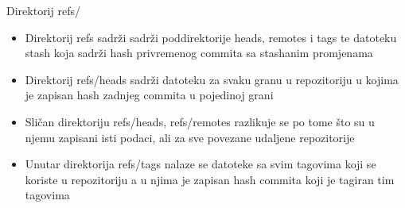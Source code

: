 \begin{frame}{Direktorij refs/}
	\begin{itemize}
		\item{Direktorij refs sadrži sadrži poddirektorije heads, remotes i tags te datoteku stash koja sadrži hash privremenog commita sa stashanim promjenama}
		\item{Direktorij refs/heads sadrži datoteku za svaku granu u repozitoriju u kojima je zapisan hash zadnjeg commita u pojedinoj grani}
		\item{Sličan direktoriju refs/heads, refs/remotes razlikuje se po tome što su u njemu zapisani isti podaci, ali za sve povezane udaljene repozitorije}
		\item{Unutar direktorija refs/tags nalaze se datoteke sa svim tagovima koji se koriste u repozitoriju a u njima je zapisan hash commita koji je tagiran tim tagovima}
	\end{itemize}
\end{frame}